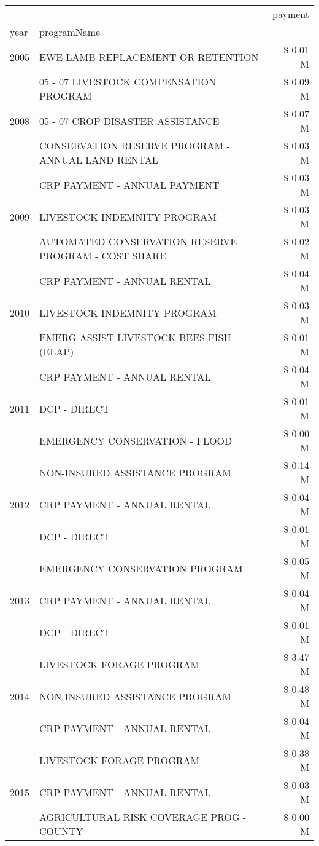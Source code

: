 \begin{tabular}{llr}
\toprule
 &  & payment \\
year & programName &  \\
\midrule
2005 & EWE LAMB REPLACEMENT OR RETENTION & \$ 0.01 M \\
\cline{1-3}
\multirow[t]{3}{*}{2008} & 05 - 07 LIVESTOCK COMPENSATION PROGRAM & \$ 0.09 M \\
 & 05 - 07 CROP DISASTER ASSISTANCE & \$ 0.07 M \\
 & CONSERVATION RESERVE PROGRAM - ANNUAL LAND RENTAL & \$ 0.03 M \\
\cline{1-3}
\multirow[t]{3}{*}{2009} & CRP PAYMENT - ANNUAL PAYMENT & \$ 0.03 M \\
 & LIVESTOCK INDEMNITY PROGRAM & \$ 0.03 M \\
 & AUTOMATED CONSERVATION RESERVE PROGRAM - COST SHARE & \$ 0.02 M \\
\cline{1-3}
\multirow[t]{3}{*}{2010} & CRP PAYMENT - ANNUAL RENTAL & \$ 0.04 M \\
 & LIVESTOCK INDEMNITY PROGRAM & \$ 0.03 M \\
 & EMERG ASSIST LIVESTOCK BEES FISH (ELAP) & \$ 0.01 M \\
\cline{1-3}
\multirow[t]{3}{*}{2011} & CRP PAYMENT - ANNUAL RENTAL & \$ 0.04 M \\
 & DCP - DIRECT & \$ 0.01 M \\
 & EMERGENCY CONSERVATION - FLOOD & \$ 0.00 M \\
\cline{1-3}
\multirow[t]{3}{*}{2012} & NON-INSURED ASSISTANCE PROGRAM & \$ 0.14 M \\
 & CRP PAYMENT - ANNUAL RENTAL & \$ 0.04 M \\
 & DCP - DIRECT & \$ 0.01 M \\
\cline{1-3}
\multirow[t]{3}{*}{2013} & EMERGENCY CONSERVATION PROGRAM & \$ 0.05 M \\
 & CRP PAYMENT - ANNUAL RENTAL & \$ 0.04 M \\
 & DCP - DIRECT & \$ 0.01 M \\
\cline{1-3}
\multirow[t]{3}{*}{2014} & LIVESTOCK FORAGE PROGRAM & \$ 3.47 M \\
 & NON-INSURED ASSISTANCE PROGRAM & \$ 0.48 M \\
 & CRP PAYMENT - ANNUAL RENTAL & \$ 0.04 M \\
\cline{1-3}
\multirow[t]{3}{*}{2015} & LIVESTOCK FORAGE PROGRAM & \$ 0.38 M \\
 & CRP PAYMENT - ANNUAL RENTAL & \$ 0.03 M \\
 & AGRICULTURAL RISK COVERAGE PROG - COUNTY & \$ 0.00 M \\

\end{tabular}
